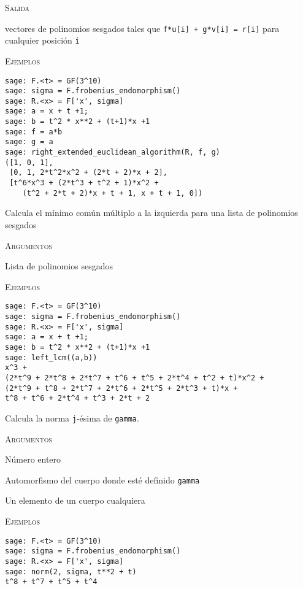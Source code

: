 \begin{description}[font=\ttfamily, style=nextline]
    \textsc{Salida}
    \begin{description}[font=\ttfamily]
        \item[u, v r] vectores de polinomios sesgados tales que \texttt{f*u[i] + g*v[i] = r[i]} para cualquier posición \texttt{i}
    \end{description}

    \textsc{Ejemplos}
    \begin{lstlisting}
sage: F.<t> = GF(3^10)
sage: sigma = F.frobenius_endomorphism()
sage: R.<x> = F['x', sigma]
sage: a = x + t +1;
sage: b = t^2 * x**2 + (t+1)*x +1
sage: f = a*b
sage: g = a
sage: right_extended_euclidean_algorithm(R, f, g)
([1, 0, 1],
 [0, 1, 2*t^2*x^2 + (2*t + 2)*x + 2],
 [t^6*x^3 + (2*t^3 + t^2 + 1)*x^2 +
    (t^2 + 2*t + 2)*x + t + 1, x + t + 1, 0])
    \end{lstlisting}

    \item[left\_lcm(pols)]
    Calcula el mínimo común múltiplo a la izquierda para una lista de polinomios sesgados

    \textsc{Argumentos}
    \begin{description}[font=\ttfamily, style=nextline]
        \item[pols] Lista de polinomios sesgados
    \end{description}

    \textsc{Ejemplos}
    \begin{lstlisting}
sage: F.<t> = GF(3^10)
sage: sigma = F.frobenius_endomorphism()
sage: R.<x> = F['x', sigma]
sage: a = x + t +1;
sage: b = t^2 * x**2 + (t+1)*x +1
sage: left_lcm((a,b))
x^3 +
(2*t^9 + 2*t^8 + 2*t^7 + t^6 + t^5 + 2*t^4 + t^2 + t)*x^2 +
(2*t^9 + t^8 + 2*t^7 + 2*t^6 + 2*t^5 + 2*t^3 + t)*x +
t^8 + t^6 + 2*t^4 + t^3 + 2*t + 2
    \end{lstlisting}

    \item[norm(j, sigma, gamma)]
    Calcula la norma \texttt{j}-ésima de \texttt{gamma}.

    \textsc{Argumentos}
    \begin{description}[font=\ttfamily]
        \item[j] Número entero
        \item[sigma] Automorfismo del cuerpo donde esté definido \texttt{gamma}
        \item[gamma] Un elemento de un cuerpo cualquiera
    \end{description}

    \textsc{Ejemplos}
    \begin{lstlisting}
sage: F.<t> = GF(3^10)
sage: sigma = F.frobenius_endomorphism()
sage: R.<x> = F['x', sigma]
sage: norm(2, sigma, t**2 + t)
t^8 + t^7 + t^5 + t^4
    \end{lstlisting}

\end{description}
